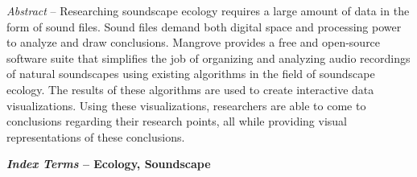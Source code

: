 \begin{flushleft}
  \setlength{\parindent}{0.125in}
  {
    {\indent\fontsize{9}{11}\bfseries
      \par\textit{Abstract}  -- Researching soundscape ecology requires a large amount of data in the form of sound files. Sound files demand both digital space and processing power to analyze and draw conclusions. Mangrove provides a free and open-source software suite that simplifies the job of organizing and analyzing audio recordings of natural soundscapes using existing algorithms in the field of soundscape ecology. The results of these algorithms are used to create interactive data visualizations. Using these visualizations, researchers are able to come to conclusions regarding their research points, all while providing visual representations of these conclusions.
    }
    \par{\fontsize{9}{11}\bfseries
      \textit{Index Terms}  -- Ecology, Soundscape
    }
  }
  \vspace{10mm} %
\end{flushleft}
